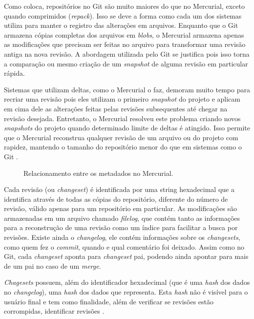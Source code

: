 \documentclass[diss]{template/setrem}
\begin{document}
Como \citet{OSullivan2009} coloca, repositórios no Git são muito maiores do que no Mercurial, exceto quando comprimidos (\emph{repack}). Isso se deve a forma como cada um dos sistemas utiliza para manter o registro das alterações em arquivos. Enquanto que o Git armazena cópias completas dos arquivos em \emph{blobs}, o Mercurial armazena apenas as modificações que precisam ser feitas no arquivo para transformar uma revisão antiga na nova revisão. A abordagem utilizada pelo Git se justifica pois isso torna a comparação ou mesmo criação de um \emph{snapshot} de alguma revisão em particular rápida.

Sistemas que utilizam deltas, como o Mercurial o faz, demoram muito tempo para recriar uma revisão pois eles utilizam o primeiro \emph{snapshot} do projeto e aplicam em cima dele as alterações feitas pelas revisões subsequentes até chegar na revisão desejada. Entretanto, o Mercurial resolveu este problema criando novos \emph{snapshots} do projeto quando determinado limite de deltas é atingido. Isso permite que o Mercurial reconstrua qualquer revisão de um arquivo ou do projeto com rapidez, mantendo o tamanho do repositório menor do que em sistemas como o Git \citep{OSullivan2009}.

\begin{figure}[!h]
    \caption{Relacionamento entre os metadados no Mercurial.}
    \label{fig:mercurial-metadata}
\end{figure}

Cada revisão (ou \emph{changeset}) é identificada por uma string hexadecimal que a identifica através de todas as cópias do repositório, diferente do número de revisão, válido apenas para um repositório em particular. As modificações são armazenadas em um arquivo chamado \emph{filelog}, que contém tanto as informações para a reconstrução de uma revisão como um índice para facilitar a busca por revisões. Existe ainda o \emph{changelog}, ele contém informações sobre os \emph{changesets}, como quem fez o \emph{commit}, quando e qual comentário foi deixado. Assim como no Git, cada \emph{changeset} aponta para \emph{changeset} pai, podendo ainda apontar para mais de um pai no caso de um \emph{merge}.

\emph{Chagesets} possuem, além do identificador hexadecimal (que é uma \emph{hash} dos dados no \emph{changelog}), uma \emph{hash} dos dados que representa. Esta \emph{hash} não é visível para o usuário final e tem como finalidade, além de verificar se revisões estão corrompidas, identificar revisões \citep{OSullivan2009}.
\end{document}
